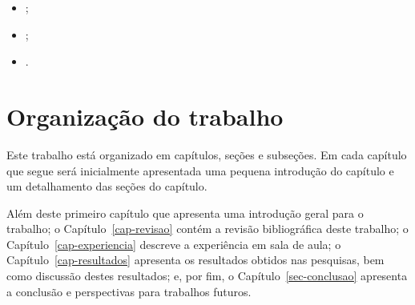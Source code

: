 \begin{itemize}
\item{;}
\item{;}
\item{.}
\end{itemize}

\section{Organização do trabalho}
Este trabalho está organizado em capítulos, seções e subseções.
Em cada capítulo que segue será inicialmente
apresentada uma pequena introdução do capítulo e um detalhamento
das seções do capítulo.

Além deste primeiro capítulo que apresenta uma introdução geral
para o trabalho;
o Capítulo~\ref{cap-revisao} contém a revisão bibliográfica deste trabalho;
o Capítulo~\ref{cap-experiencia} descreve a experiência em sala de aula;
o Capítulo~\ref{cap-resultados} apresenta os resultados obtidos nas pesquisas, bem
como discussão destes resultados;
e, por fim, o Capítulo~\ref{sec-conclusao} apresenta a conclusão e perspectivas
para trabalhos futuros.
